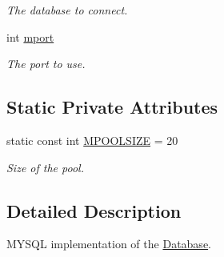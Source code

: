 \begin{DoxyCompactItemize}
\begin{DoxyCompactList}\small\item\em The database to connect. \item\end{DoxyCompactList}\item 
\hypertarget{classMYSQLDatabase_a63452391989f61d2ca025ba16e354abf}{
int \hyperlink{classMYSQLDatabase_a63452391989f61d2ca025ba16e354abf}{mport}}
\label{classMYSQLDatabase_a63452391989f61d2ca025ba16e354abf}

\begin{DoxyCompactList}\small\item\em The port to use. \item\end{DoxyCompactList}\end{DoxyCompactItemize}
\subsection*{Static Private Attributes}
\begin{DoxyCompactItemize}
\item 
\hypertarget{classMYSQLDatabase_ab49123dfec0961bee257a282e2bc1505}{
static const int \hyperlink{classMYSQLDatabase_ab49123dfec0961bee257a282e2bc1505}{MPOOLSIZE} = 20}
\label{classMYSQLDatabase_ab49123dfec0961bee257a282e2bc1505}

\begin{DoxyCompactList}\small\item\em Size of the pool. \item\end{DoxyCompactList}\end{DoxyCompactItemize}


\subsection{Detailed Description}
MYSQL implementation of the \hyperlink{classDatabase}{Database}. 

